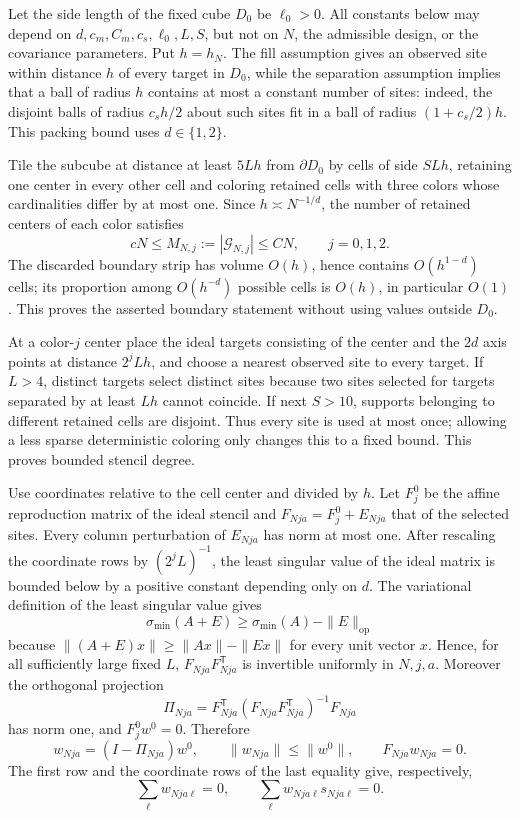 Let the side length of the fixed cube \(D_0\) be \(\ell_0>0\).  All constants below may depend on \(d,c_m,C_m,c_s,\ell_0,L,S\), but not on \(N\), the admissible design, or the covariance parameters.  Put \(h=h_N\).  The fill assumption gives an observed site within distance \(h\) of every target in \(D_0\), while the separation assumption implies that a ball of radius \(h\) contains at most a constant number of sites: indeed, the disjoint balls of radius \(c_sh/2\) about such sites fit in a ball of radius \((1+c_s/2)h\).  This packing bound uses \(d\in\{1,2\}\).

Tile the subcube at distance at least \(5Lh\) from \(\partial D_0\) by cells of side \(SLh\), retaining one center in every other cell and coloring retained cells with three colors whose cardinalities differ by at most one.  Since \(h\asymp N^{-1/d}\), the number of retained centers of each color satisfies
\[
 cN\le M_{N,j}:=|\mathcal G_{N,j}|\le CN,
 \qquad j=0,1,2.
\]
The discarded boundary strip has volume \(O(h)\), hence contains \(O(h^{1-d})\) cells; its proportion among \(O(h^{-d})\) possible cells is \(O(h)\), in particular \(O(1)\).  This proves the asserted boundary statement without using values outside \(D_0\).

At a color-\(j\) center place the ideal targets consisting of the center and the \(2d\) axis points at distance \(2^jLh\), and choose a nearest observed site to every target.  If \(L>4\), distinct targets select distinct sites because two sites selected for targets separated by at least \(Lh\) cannot coincide.  If next \(S>10\), supports belonging to different retained cells are disjoint.  Thus every site is used at most once; allowing a less sparse deterministic coloring only changes this to a fixed bound.  This proves bounded stencil degree.

Use coordinates relative to the cell center and divided by \(h\).  Let \(F^0_j\) be the affine reproduction matrix of the ideal stencil and \(F_{Nja}=F^0_j+E_{Nja}\) that of the selected sites.  Every column perturbation of \(E_{Nja}\) has norm at most one.  After rescaling the coordinate rows by \((2^jL)^{-1}\), the least singular value of the ideal matrix is bounded below by a positive constant depending only on \(d\).  The variational definition of the least singular value gives
\[
 \sigma_{\min}(A+E)\ge \sigma_{\min}(A)-\|E\|_{\mathrm{op}}
\]
because \(\|(A+E)x\|\ge\|Ax\|-\|Ex\|\) for every unit vector \(x\).  Hence, for all sufficiently large fixed \(L\), \(F_{Nja}F_{Nja}^{\mathsf T}\) is invertible uniformly in \(N,j,a\).  Moreover the orthogonal projection
\[
 \Pi_{Nja}=F_{Nja}^{\mathsf T}(F_{Nja}F_{Nja}^{\mathsf T})^{-1}F_{Nja}
\]
has norm one, and \(F^0_jw^0=0\).  Therefore
\[
 w_{Nja}=(I-\Pi_{Nja})w^0,
 \qquad \|w_{Nja}\|\le \|w^0\|,
 \qquad F_{Nja}w_{Nja}=0.
\]
The first row and the coordinate rows of the last equality give, respectively,
\[
 \sum_\ell w_{Nja\ell}=0,
 \qquad
 \sum_\ell w_{Nja\ell}s_{Nja\ell}=0.
\]

